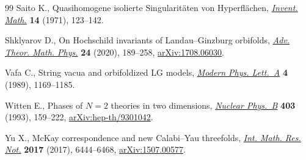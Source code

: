 \documentclass[10pt,a4paper]{article}
\numberwithin{equation}{section}
\providecommand{\LastPageEnding}{}
\begin{document}
\begin{thebibliography}{99}
Saito K., Quasihomogene isolierte {S}ingularit\"aten von {H}yperfl\"achen,
 \href{https://doi.org/10.1007/BF01405360}{\textit{Invent. Math.}} \textbf{14} (1971), 123--142.

Shklyarov D., On {H}ochschild invariants of {L}andau--{G}inzburg orbifolds,
 \href{https://doi.org/10.4310/ATMP.2020.v24.n1.a6}{\textit{Adv. Theor. Math. Phys.}} \textbf{24} (2020), 189--258,
 \href{https://arxiv.org/abs/1708.06030}{arXiv:1708.06030}.


Vafa C., String vacua and orbifoldized {LG} models, \href{https://doi.org/10.1142/S0217732389001350}{\textit{Modern Phys.
 Lett.~A}} \textbf{4} (1989), 1169--1185.

Witten E., Phases of {$N=2$} theories in two dimensions, \href{https://doi.org/10.1016/0550-3213(93)90033-L}{\textit{Nuclear
 Phys.~B}} \textbf{403} (1993), 159--222, \href{https://arxiv.org/abs/hep-th/9301042}{arXiv:hep-th/9301042}.

Yu X., Mc{K}ay correspondence and new {C}alabi--{Y}au threefolds, \href{https://doi.org/10.1093/imrn/rnv391}{\textit{Int.
 Math. Res. Not.}} \textbf{2017} (2017), 6444--6468, \href{https://arxiv.org/abs/1507.00577}{arXiv:1507.00577}.

\end{thebibliography}\LastPageEnding
\end{document}
